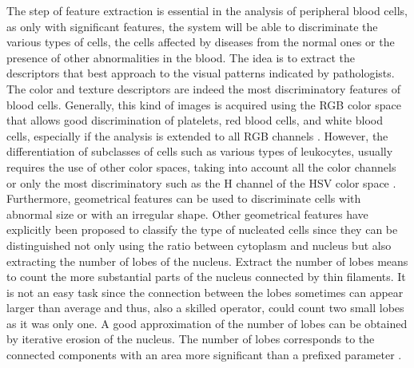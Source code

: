 \documentclass[final,a4paper,12pt,english]{UnicaPhdThesis3}
\begin{document}
The step of feature extraction is essential in the analysis of peripheral blood cells, as only with significant features, the system will be able to discriminate the various types of cells, the cells affected by diseases from the normal ones or the presence of other abnormalities in the blood. The idea is to extract the descriptors that best approach to the visual patterns indicated by pathologists. The color and texture descriptors are indeed the most discriminatory features of blood cells. Generally, this kind of images is acquired using the RGB color space that allows good discrimination of platelets, red blood cells, and white blood cells, especially if the analysis is extended to all RGB channels \cite{Angulo}. However, the differentiation of subclasses of cells such as various types of leukocytes, usually requires the use of other color spaces, taking into account all the color channels or only the most discriminatory such as the H channel of the HSV color space \cite{Hengen}.
Furthermore, geometrical features can be used to discriminate cells with abnormal size or with an irregular shape. Other geometrical features have explicitly been proposed to classify the type of nucleated cells since they can be distinguished not only using the ratio between cytoplasm and nucleus \cite{Piuri, Sco05, Sco06} but also extracting the number of lobes of the nucleus. Extract the number of lobes means to count the more substantial parts of the nucleus connected by thin filaments. It is not an easy task since the connection between the lobes sometimes can appear larger than average and thus, also a skilled operator, could count two small lobes as it was only one. A good approximation of the number of lobes can be obtained by iterative erosion of the nucleus. The number of lobes corresponds to the connected components with an area more significant than a prefixed parameter \cite{Piuri}.  
\end{document}
